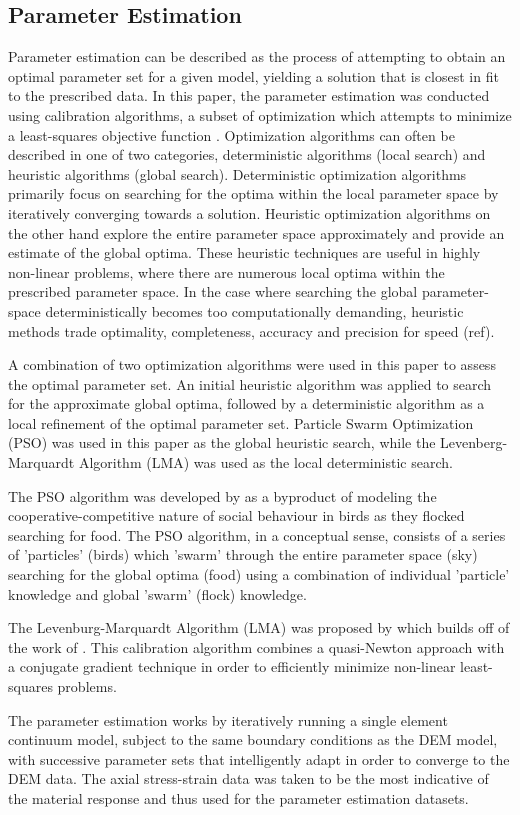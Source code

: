 \subsection{Parameter Estimation}
Parameter estimation can be described as the process of attempting to obtain an optimal parameter set for a given model, yielding a solution that is closest in fit to the prescribed data. In this paper, the parameter estimation was conducted using calibration algorithms, a subset of optimization which attempts to minimize a least-squares objective function \cite{matott_ostrich:_2008}. Optimization algorithms can often be described in one of two categories, deterministic algorithms (local search) and heuristic algorithms (global search). Deterministic optimization algorithms primarily focus on searching for the optima within the local parameter space by iteratively converging towards a solution. Heuristic optimization algorithms on the other hand explore the entire parameter space approximately and provide an estimate of the global optima. These heuristic techniques are useful in highly non-linear problems, where there are numerous local optima within the prescribed parameter space. In the case where searching the global parameter-space deterministically becomes too computationally demanding, heuristic methods trade optimality, completeness, accuracy and precision for speed (ref). 

A combination of two optimization algorithms were used in this paper to assess the optimal parameter set. An initial heuristic algorithm was applied to search for the approximate global optima, followed by a deterministic algorithm as a local refinement of the optimal parameter set. Particle Swarm Optimization (PSO) was used in this paper as the global heuristic search, while the Levenberg-Marquardt Algorithm (LMA) was used as the local deterministic search. 

The PSO algorithm was developed by \citet{Kennedy} as a byproduct of modeling the cooperative-competitive nature of social behaviour in birds as they flocked searching for food. The PSO algorithm, in a conceptual sense, consists of a series of 'particles' (birds) which 'swarm' through the entire parameter space (sky) searching for the global optima (food) using a combination of individual 'particle' knowledge and global 'swarm' (flock) knowledge.

The Levenburg-Marquardt Algorithm (LMA) was proposed by \citet{marquardt_algorithm_1963} which builds off of the work of \citet{levenberg_method_1944}. This calibration algorithm combines a quasi-Newton approach with a conjugate gradient technique in order to efficiently minimize non-linear least-squares problems. 

The parameter estimation works by iteratively running a single element continuum model, subject to the same boundary conditions as the DEM model, with successive parameter sets that intelligently adapt in order to converge to the DEM data. The axial stress-strain data was taken to be the most indicative of the material response and thus used for the parameter estimation datasets.
